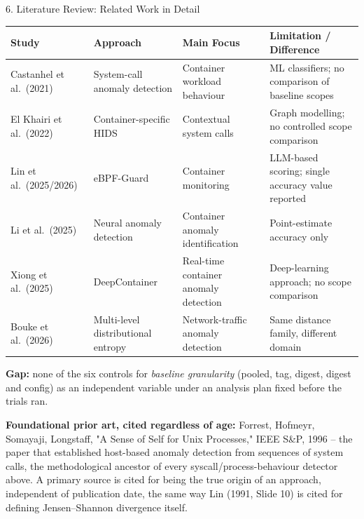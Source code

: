 \documentclass[aspectratio=169, 11pt]{beamer}
\renewcommand{\arraystretch}{1.15}
\begin{document}
\begin{frame}{6. Literature Review: Related Work in Detail}
    \scriptsize
    \begin{table}
        \centering
        \renewcommand{\arraystretch}{1.1}
        \setlength{\tabcolsep}{3pt}
        \begin{tabular}{p{2.5cm}p{2.6cm}p{2.6cm}p{4.1cm}}
            \toprule
            \textbf{Study} & \textbf{Approach} & \textbf{Main Focus} & \textbf{Limitation / Difference} \\
            \midrule
            Castanhel et al.\ (2021) & System-call anomaly detection & Container workload behaviour & ML classifiers; no comparison of baseline scopes \\
            \addlinespace
            El Khairi et al.\ (2022) & Container-specific HIDS & Contextual system calls & Graph modelling; no controlled scope comparison \\
            \addlinespace
            Lin et al.\ (2025/2026) & eBPF-Guard & Container monitoring & LLM-based scoring; single accuracy value reported \\
            \addlinespace
            Li et al.\ (2025) & Neural anomaly detection & Container anomaly identification & Point-estimate accuracy only \\
            \addlinespace
            Xiong et al.\ (2025) & DeepContainer & Real-time container anomaly detection & Deep-learning approach; no scope comparison \\
            \addlinespace
            Bouke et al.\ (2026) & Multi-level distributional entropy & Network-traffic anomaly detection & Same distance family, different domain \\
            \bottomrule
        \end{tabular}
    \end{table}
    \vspace{0.15cm}
    \footnotesize\textbf{Gap:} none of the six controls for \emph{baseline granularity} (pooled, tag, digest, digest and config) as an independent variable under an analysis plan fixed before the trials ran.

    \vspace{0.1cm}
    \scriptsize\textbf{Foundational prior art, cited regardless of age:} Forrest, Hofmeyr, Somayaji, Longstaff, "A Sense of Self for Unix Processes," IEEE S\&P, 1996 \cite{forrest1996} -- the paper that established host-based anomaly detection from sequences of system calls, the methodological ancestor of every syscall/process-behaviour detector above. A primary source is cited for being the true origin of an approach, independent of publication date, the same way Lin (1991, Slide 10) is cited for defining Jensen--Shannon divergence itself.
\end{frame}
\end{document}

